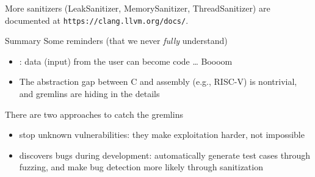 \begin{framedremark}
    More sanitizers (LeakSanitizer, MemorySanitizer, ThreadSanitizer) are documented at \texttt{https://clang.llvm.org/docs/}.
\end{framedremark}

\begin{parag}{Summary}
    Some reminders (that we never \textit{fully} understand)
    \begin{itemize}
        \item {}: data (input) from the user can become code \dots{} Boooom
        \item The abstraction gap between C and assembly (e.g., RISC-V) is nontrivial, and gremlins are hiding in the details
    \end{itemize}
    There are two approaches to catch the gremlins
    \begin{itemize}
        \item {} stop unknown vulnerabilities: they make exploitation harder, not impossible
        \item {} discovers bugs during development: automatically generate test cases through fuzzing, and make bug detection more likely through sanitization
    \end{itemize}
\end{parag}
